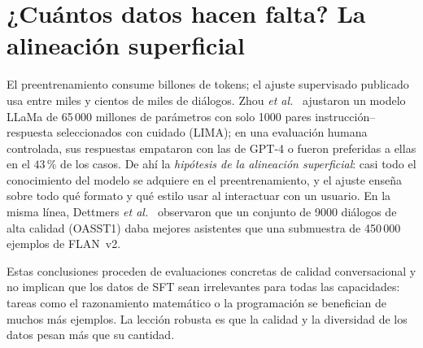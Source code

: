 \section{¿Cuántos datos hacen falta? La alineación superficial}

El preentrenamiento consume billones de tokens; el ajuste supervisado publicado usa entre miles y cientos de miles de diálogos. Zhou \emph{et al.}~\cite{zhou-lima} ajustaron un modelo LLaMa de 65\,000 millones de parámetros con solo 1000 pares instrucción--respuesta seleccionados con cuidado (LIMA); en una evaluación humana controlada, sus respuestas empataron con las de GPT-4 o fueron preferidas a ellas en el $43\,\%$ de los casos. De ahí la \emph{hipótesis de la alineación superficial}: casi todo el conocimiento del modelo se adquiere en el preentrenamiento, y el ajuste enseña sobre todo qué formato y qué estilo usar al interactuar con un usuario. En la misma línea, Dettmers \emph{et al.}~\cite[§1]{dettmers} observaron que un conjunto de 9000 diálogos de alta calidad (OASST1) daba mejores asistentes que una submuestra de 450\,000 ejemplos de FLAN~v2.

\begin{observacion}
Estas conclusiones proceden de evaluaciones concretas de calidad conversacional y no implican que los datos de SFT sean irrelevantes para todas las capacidades: tareas como el razonamiento matemático o la programación se benefician de muchos más ejemplos. La lección robusta es que la calidad y la diversidad de los datos pesan más que su cantidad.
\end{observacion}

